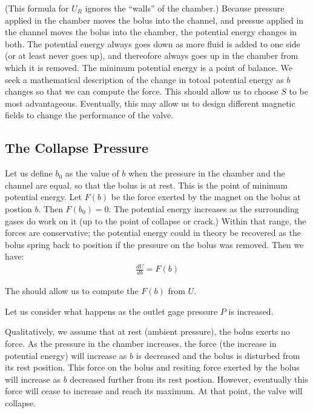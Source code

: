 \documentclass{asme2ej}
\begin{document}
(This formula for $U_R$ ignores the ``walls'' of the chamber.)
Because pressure applied in the chamber moves the bolus
into the channel, and pressue applied in the channel moves
the bolus into the chamber, the
potential energy changes in both.
The potential energy always goes down as more fluid is added to one side (or
at least never goes up), and thereofore always goes up in the chamber from which it is removed.
The minimum potential energy is a point of balance.
We seek a mathematical description of the
change in totoal potential energy as $b$ changes so
that we can compute the force.
This should allow us to choose $S$ to be most advantageous.
Eventually, this may allow us to design different
magnetic fields to change the performance of the valve.



\subsection{The Collapse Pressure}

Let us define $b_0$ as the value of $b$ when the pressure in the chamber and the channel are equal,
so that the bolus is at rest. This is the point of minimum potential energy.
Let $F(b)$ be the force exerted by the magnet on the bolus at postion $b$.
Then $F(b_0) = 0$.
The potential energy increases as the surrounding gases do work on it (up to the point of collapse
or crack.)
Within that range, the forces are conservative; the potential energy could in theory
be recovered as the bolus spring back to position
if the pressure on the bolus was removed.
Then we have:
\begin{align}
  \frac{d U}{db} =  F(b)
\end{align}

The should allow us to compute the $F(b)$ from $U$.

Let us consider what happens as the outlet gage pressure $P$ is increased.

Qualitatively, we assume that at rest (ambient pressure), the bolus exerts no force. As the
pressure in the chamber increases, the force (the increase in potential energy) will increase
as $b$ is decreased and the bolus is disturbed from its rest position. This force on the
bolus and resiting force exerted by the bolus will increase
as $b$ decreased further from its rest postion. However, eventually this force will cease to
increase and reach its maximum. At that point, the valve will collapse.
\end{document}
